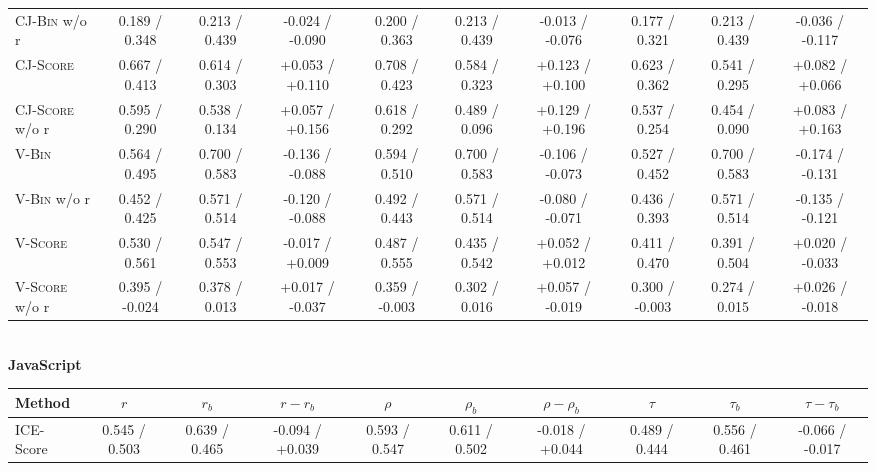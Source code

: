 \begin{table}[t]
\begin{tabular}{@{}l|ccc|ccc|ccc@{}}
        \textsc{CJ-Bin} w/o r   & 0.189 / 0.348   & 0.213 / 0.439   & -0.024 / -0.090                     & 0.200 / 0.363   & 0.213 / 0.439   & -0.013 / -0.076                     & 0.177 / 0.321   & 0.213 / 0.439   & -0.036 / -0.117                     \\
        \textsc{CJ-Score}       & 0.667 / 0.413   & 0.614 / 0.303   & +0.053 / +0.110                     & 0.708 / 0.423   & 0.584 / 0.323   & +0.123 / +0.100                     & 0.623 / 0.362   & 0.541 / 0.295   & +0.082 / +0.066                     \\
        \textsc{CJ-Score} w/o r & 0.595 / 0.290   & 0.538 / 0.134   & +0.057 / +0.156                     & 0.618 / 0.292   & 0.489 / 0.096   & +0.129 / +0.196                     & 0.537 / 0.254   & 0.454 / 0.090   & +0.083 / +0.163                     \\
        \midrule
        \textsc{V-Bin}          & 0.564 / 0.495   & 0.700 / 0.583   & -0.136 / -0.088                     & 0.594 / 0.510   & 0.700 / 0.583   & -0.106 / -0.073                     & 0.527 / 0.452   & 0.700 / 0.583   & -0.174 / -0.131                     \\
        \textsc{V-Bin} w/o r    & 0.452 / 0.425   & 0.571 / 0.514   & -0.120 / -0.088                     & 0.492 / 0.443   & 0.571 / 0.514   & -0.080 / -0.071                     & 0.436 / 0.393   & 0.571 / 0.514   & -0.135 / -0.121                     \\
        \textsc{V-Score}        & 0.530 / 0.561   & 0.547 / 0.553   & -0.017 / +0.009                     & 0.487 / 0.555   & 0.435 / 0.542   & +0.052 / +0.012                     & 0.411 / 0.470   & 0.391 / 0.504   & +0.020 / -0.033                     \\
        \textsc{V-Score} w/o r  & 0.395 / -0.024  & 0.378 / 0.013   & +0.017 / -0.037                     & 0.359 / -0.003  & 0.302 / 0.016   & +0.057 / -0.019                     & 0.300 / -0.003  & 0.274 / 0.015   & +0.026 / -0.018                     \\
        \bottomrule
    \end{tabular}
    \\[7pt]
    {\bf JavaScript}\\
    \begin{tabular}{@{}l|ccc|ccc|ccc@{}}
        \toprule
        Method & $r$ & $r_b$ & $r-r_b$ & $\rho$ & $\rho_b$ & $\rho-\rho_b$ & $\tau$ & $\tau_b$ & $\tau-\tau_b$ \\
        \midrule
        ICE-Score               & 0.545 / 0.503   & 0.639 / 0.465   & -0.094 / +0.039                     & 0.593 / 0.547   & 0.611 / 0.502   & -0.018 / +0.044                     & 0.489 / 0.444   & 0.556 / 0.461   & -0.066 / -0.017                     \\

\end{tabular}
\end{table}
